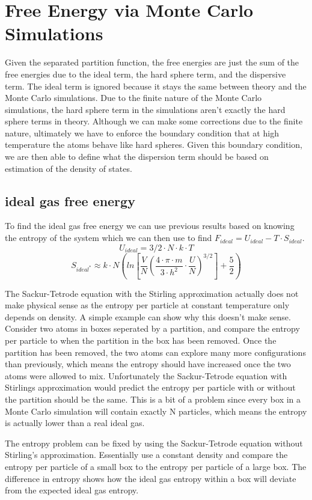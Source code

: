 \section{Free Energy via Monte Carlo Simulations}
Given the separated partition function, the free energies are just the sum of the free energies due to the ideal term, the hard sphere term, and the dispersive term. The ideal term is ignored because it stays the same between theory and the Monte Carlo simulations. Due to the finite nature of the Monte Carlo simulations, the hard sphere term in the simulations aren't exactly the hard sphere terms in theory. Although we can make some corrections due to the finite nature, ultimately we have to enforce the boundary condition that at high temperature the atoms behave like hard spheres. Given this boundary condition, we are then able to define what the dispersion term should be based on estimation of the density of states.
\subsection{ideal gas free energy}
To find the ideal gas free energy we can use previous results based on knowing the entropy of the system which we can then use to find $F_{ideal}=U_{ideal}-T\cdot S_{ideal}$.
$$U_{ideal}=3/2\cdot N\cdot k\cdot T$$
$$S_{ideal^*}\approx k\cdot N \left ( ln\left [ \frac{V}{N}\left ( \frac{4\cdot \pi\cdot m}{3\cdot h^2}\cdot \frac{U}{N} \right)^{3/2} \right]+\frac{5}{2}\right )$$

The Sackur-Tetrode equation with the Stirling approximation actually does not make physical sense as the entropy per particle at constant temperature only depends on density. A simple example can show why this doesn't make sense. Consider two atoms in boxes seperated by a partition, and compare the entropy per particle to when the partition in the box has been removed. Once the partition has been removed, the two atoms can explore many more configurations than previously, which means the entropy should have increased once the two atoms were allowed to mix. Unfortunately the Sackur-Tetrode equation with Stirlings approximation would predict the entropy per particle with or without the partition should be the same. This is a bit of a problem since every box in a Monte Carlo simulation will contain exactly N particles, which means the entropy is actually lower than a real ideal gas.

The entropy problem can be fixed by using the Sackur-Tetrode equation without Stirling's approximation. Essentially use a constant density and compare the entropy per particle of a small box to the entropy per particle of a large box. The difference in entropy shows how the ideal gas entropy within a box will deviate from the expected ideal gas entropy.

